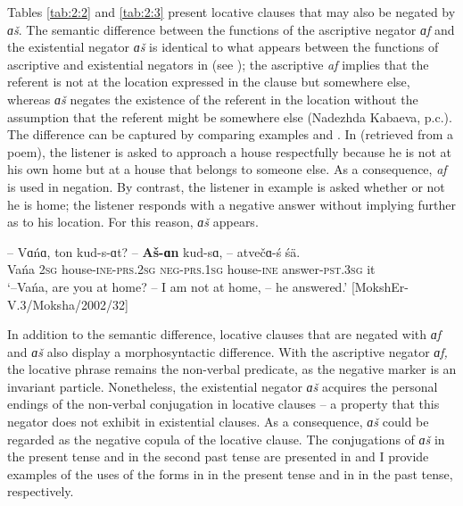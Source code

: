 \documentclass[output=paper,colorlinks,citecolor=brown,draft,draftmode]{langscibook}
\begin{document}
  Tables \ref{tab:2:2} and \ref{tab:2:3} present locative clauses that may also be negated by \textit{ɑš}. The semantic difference between the functions of the ascriptive negator \textit{ɑf} and the existential negator \textit{ɑš} is identical to what appears between the functions of ascriptive and existential negators in  (see \citealt[91]{Hamari2007}); the ascriptive \textit{af} implies that the referent is not at the location expressed in the clause but somewhere else, whereas \textit{ɑš} negates the existence of the referent in the location without the assumption that the referent might be somewhere else (Nadezhda Kabaeva, p.c.). The difference can be captured by comparing examples  and . In  (retrieved from a poem), the listener is asked to approach a house respectfully because he is not at his own home but at a house that belongs to someone else. As a consequence, \textit{af} is used in negation. By contrast, the listener in example  is asked whether or not he is home; the listener responds with a negative answer without implying further as to his location. For this reason, \textit{ɑš} appears.

\ea\label{ex:moksha-Vanja}
\gll -- Vɑńɑ, ton kud-s-ɑt? -- \textbf{Aš-ɑn} kud-sɑ, -- atvečɑ-ś śä.\\
{} Vańa \textsc{2sg} house-\textsc{ine-prs.2sg} {} \textsc{neg-prs.1sg} house-\textsc{ine} {} answer-\textsc{pst.3sg} it\\
\glt `--Vańa, are you at home? -- I am not at home, -- he answered.' [MokshEr-V.3/Moksha/2002/32]
\z

  In addition to the semantic difference, locative clauses that are negated with \textit{ɑf} and \textit{ɑš} also display a morphosyntactic difference. With the ascriptive negator \textit{ɑf,} the locative phrase remains the non-verbal predicate, as the negative marker is an invariant particle. Nonetheless, the existential negator \textit{ɑš} acquires the personal endings of the non-verbal conjugation in locative clauses -- a property that this negator does not exhibit in existential clauses. As a consequence, \textit{ɑš} could be regarded as the negative copula of the locative clause. The conjugations of \textit{ɑš} in the present tense and in the second past tense are presented in  and I provide examples of the uses of the forms in  in the present tense and in  in the past tense, respectively.
\end{document}
